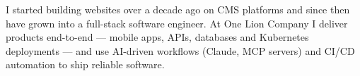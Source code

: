
I started building websites over a decade ago on CMS platforms and since then have grown into a full-stack software engineer. At One Lion Company I deliver products end-to-end — mobile apps, APIs, databases and Kubernetes deployments — and use AI-driven workflows (Claude, MCP servers) and CI/CD automation to ship reliable software.
